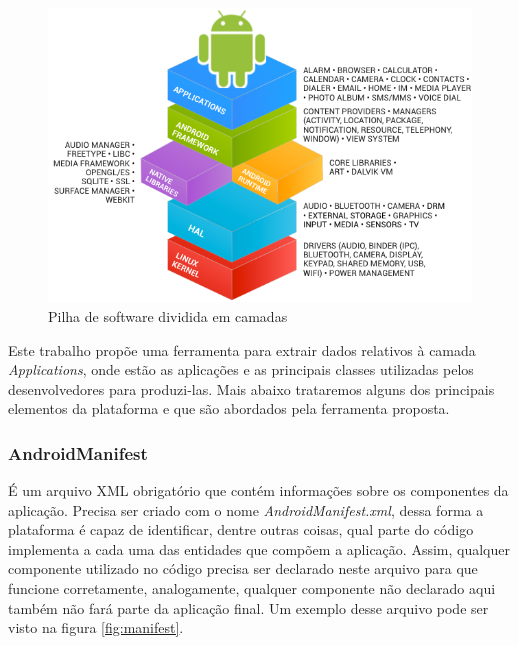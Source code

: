\documentclass[a4paper,12pt]{article}
\begin{document}
\begin{figure}[h]
\centering
\includegraphics[width=0.8\linewidth]{imgs/android_framework_details.png}
\caption{Pilha de software dividida em camadas \cite{androidSource}}
\label{fig:androidStack}
\end{figure}

Este trabalho propõe uma ferramenta para extrair dados relativos à camada \textit{Applications}, onde estão as aplicações e as principais classes utilizadas pelos desenvolvedores para produzi-las. Mais abaixo trataremos alguns dos principais elementos da plataforma e que são abordados pela ferramenta proposta.

\subsubsection{AndroidManifest}
É um arquivo XML obrigatório que contém informações sobre os componentes da aplicação. Precisa ser criado com o nome \textit{AndroidManifest.xml}, dessa forma a plataforma é capaz de identificar, dentre outras coisas, qual parte do código implementa a cada uma das entidades que compõem a aplicação. Assim, qualquer componente utilizado no código precisa ser declarado neste arquivo para que funcione corretamente, analogamente, qualquer componente não declarado aqui também não fará parte da aplicação final. Um exemplo desse arquivo pode ser visto na figura \ref{fig:manifest}.
\end{document}
